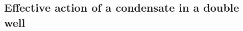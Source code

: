 % 
% 


% 
% 
% 
% 
% 
% 



\setcounter{section}{8}
\setcounter{subsection}{0}
\subsection{Effective action of a condensate in a double well}



% 








